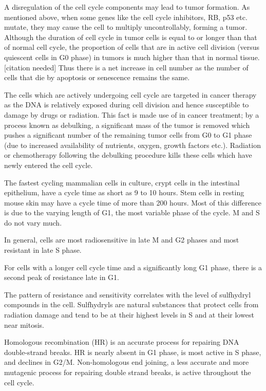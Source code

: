A disregulation of the cell cycle components may lead to tumor formation. As mentioned above, when some genes like the cell cycle inhibitors, RB, p53 etc. mutate, they may cause the cell to multiply uncontrollably, forming a tumor. Although the duration of cell cycle in tumor cells is equal to or longer than that of normal cell cycle, the proportion of cells that are in active cell division (versus quiescent cells in G0 phase) in tumors is much higher than that in normal tissue.{[}citation needed{]} Thus there is a net increase in cell number as the number of cells that die by apoptosis or senescence remains the same.

The cells which are actively undergoing cell cycle are targeted in cancer therapy as the DNA is relatively exposed during cell division and hence susceptible to damage by drugs or radiation. This fact is made use of in cancer treatment; by a process known as debulking, a significant mass of the tumor is removed which pushes a significant number of the remaining tumor cells from G0 to G1 phase (due to increased availability of nutrients, oxygen, growth factors etc.). Radiation or chemotherapy following the debulking procedure kills these cells which have newly entered the cell cycle.

The fastest cycling mammalian cells in culture, crypt cells in the intestinal epithelium, have a cycle time as short as 9 to 10 hours. Stem cells in resting mouse skin may have a cycle time of more than 200 hours. Most of this difference is due to the varying length of G1, the most variable phase of the cycle. M and S do not vary much.

In general, cells are most radiosensitive in late M and G2 phases and most resistant in late S phase.

For cells with a longer cell cycle time and a significantly long G1 phase, there is a second peak of resistance late in G1.

The pattern of resistance and sensitivity correlates with the level of sulfhydryl compounds in the cell. Sulfhydryls are natural substances that protect cells from radiation damage and tend to be at their highest levels in S and at their lowest near mitosis.

Homologous recombination (HR) is an accurate process for repairing DNA double-strand breaks. HR is nearly absent in G1 phase, is most active in S phase, and declines in G2/M. Non-homologous end joining, a less accurate and more mutagenic process for repairing double strand breaks, is active throughout the cell cycle.


